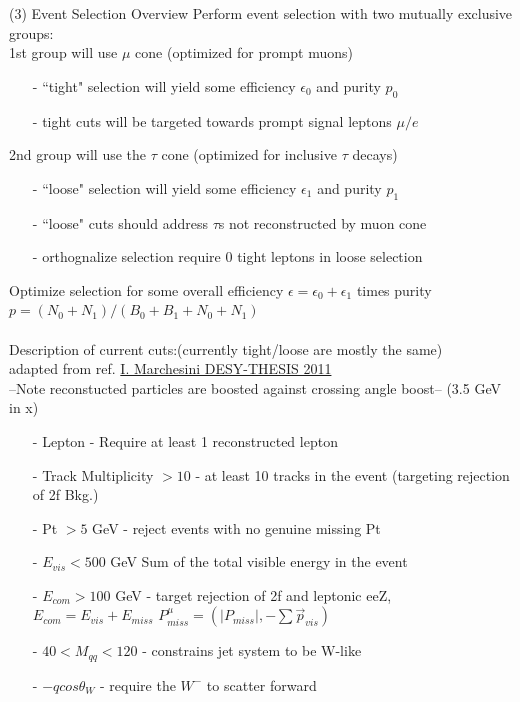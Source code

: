 \documentclass[10pt]{beamer}
\begin{document}
\begin{frame}{(3) Event Selection Overview}
Perform event selection with two mutually exclusive groups:\\
1st group will use $\mu$ cone (optimized for prompt muons)
	\begin{itemize}
		\scriptsize
		\item[-]``tight" selection will yield some efficiency $\epsilon_0$ and purity $p_0$
		\item[-] tight cuts will be targeted towards prompt signal leptons $\mu/e$ 
	\end{itemize} 
2nd group will use the $\tau$ cone (optimized for inclusive $\tau$ decays)
	\begin{itemize}
	\scriptsize
		\item[-] ``loose" selection will yield some efficiency $\epsilon_1$ and purity $p_1$
		\item[-] ``loose" cuts should address $\tau$s not reconstructed by muon cone
		\item[-] orthognalize selection require 0 tight leptons in loose selection
	\end{itemize}
Optimize selection for some overall efficiency $\epsilon = \epsilon_0 + \epsilon_1$ times purity $p = (N_0 + N_1) / (B_0 + B_1 + N_0 +N_1)$\\
\quad \quad \\
Description of current cuts:(currently tight/loose are mostly the same)\\
\tiny
adapted from ref. \url{I. Marchesini DESY-THESIS 2011}\\
\scriptsize
--Note reconstucted particles are boosted against crossing angle boost-- (3.5 GeV in x)\\
\begin{itemize}
\item[-]Lepton - Require at least 1 reconstructed lepton
\item[-]Track Multiplicity $> 10$ - at least 10 tracks in the event (targeting rejection of 2f Bkg.)
\item[-]Pt $> 5$ GeV - reject events with no genuine missing Pt 
\item[-]$E_{vis} < 500$ GeV Sum of the total visible energy in the event 
\item[-]$E_{com} > 100$ GeV - target rejection of 2f and leptonic eeZ, $E_{com} = E_{vis} + E_{miss} \, \,  P^\mu_{miss} = (|P_{miss}|, -\sum{\vec{p}_{vis}}) $
\item[-]$40<M_{qq}<120$ - constrains jet system to be W-like
\item[-] $-qcos\theta_W$ - require the $W^-$ to scatter forward

\end{itemize}


	
	

\end{frame}
\end{document}
